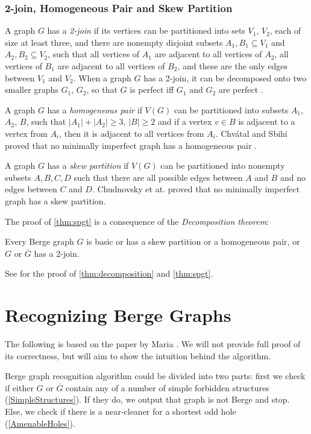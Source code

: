 \subsubsection{2-join, Homogeneous Pair and Skew Partition}
A graph $G$ has a \emph{2-join} if its vertices can be partitioned into sets $V_1$, $V_2$, each of size at least three, and there are nonempty disjoint subsets $A_1, B_1 \subseteq V_1$ and $A_2, B_2 \subseteq V_2$, such that all vertices of $A_1$ are adjacent to all vertices of $A_2$, all vertices of $B_1$ are adjacent to all vertices of $B_2$, and these are the only edges between $V_1$ and $V_2$. When a graph $G$ has a 2-join, it can be decomposed onto two smaller graphs $G_1$, $G_2$, so that $G$ is perfect iff $G_1$ and $G_2$ are perfect \cite{Cornujols1985}.

A graph $G$ has a \emph{homogeneous pair} if $V(G)$ can be partitioned into subsets $A_1$, $A_2$, $B$, such that $|A_1|+|A_2| \geq 3$, $|B| \geq 2$ and if a vertex $v \in B$ is adjacent to a vertex from $A_i$, then it is adjacent to all vertices from $A_i$. Chvátal and Sbihi proved that no minimally imperfect graph has a homogeneous pair \cite{Chvtal1987}.

A graph $G$ has a \emph{skew partition} if $V(G)$ can be partitioned into nonempty subsets $A, B, C, D$ such that there are all possible edges between $A$ and $B$ and no edges between $C$ and $D$. Chudnovsky et at. proved that no minimally imperfect graph has a skew partition.

The proof of \cref{thm:spgt} is a consequence of the \emph{Decomposition theorem}:
\begin{theorem}
	\label{thm:decomposition}
	Every Berge graph $G$ is basic or has a skew partition or a homogeneous pair, or $G$ or $\overline{G}$ has a 2-join.
\end{theorem}

See \cite{MC06} for the proof of \cref{thm:decomposition} and \cref{thm:spgt}.

\section{Recognizing Berge Graphs}
\label{sec:recognizingBerge}

The following is based on the paper by Maria \citeauthor{MC05}  \cite{MC05}. We will not provide full proof of its correctness, but will aim to show the intuition behind the algorithm.

Berge graph recognition algorithm could be divided into two parts: first we check if either $G$ or $\overline{G}$ contain any of a number of simple forbidden structures (\cref{SimpleStructures}). If they do, we output that graph is not Berge and stop. Else, we check if there is a near-cleaner for a shortest odd hole (\cref{AmenableHoles}).

